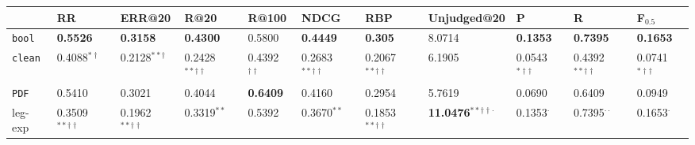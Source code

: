 \begin{tabular}{lllllllllll}
\toprule
{} &                           RR &                       ERR@20 &                         R@20 &                      R@100 &                         NDCG &                          RBP &                                 Unjudged@20 &                           P &                            R &                     F$_{0.5}$ \\
\midrule
\texttt{bool}    &              \textbf{0.5526} &              \textbf{0.3158} &                \textbf{0.4300} &                       0.5800 &              \textbf{0.4449} &               \textbf{0.305} &                                      8.0714 &             \textbf{0.1353} &              \textbf{0.7395} &             \textbf{0.1653} \\
\texttt{clean} &          0.4088$^{*\dagger}$ &         0.2128$^{**\dagger}$ &  0.2428$^{**\dagger\dagger}$ &  0.4392$^{\dagger\dagger}$ &  0.2683$^{**\dagger\dagger}$ &  0.2067$^{**\dagger\dagger}$ &                                 6.1905$^{}$ &  0.0543$^{*\dagger\dagger}$ &  0.4392$^{**\dagger\dagger}$ &  0.0741$^{*\dagger\dagger}$ \\
\texttt{PDF}     &                  0.5410$^{}$ &                  0.3021$^{}$ &                  0.4044$^{}$ &       \textbf{0.6409}$^{}$ &                  0.4160$^{}$ &                  0.2954$^{}$ &                                 5.7619$^{}$ &                 0.0690$^{}$ &                  0.6409$^{}$ &                 0.0949$^{}$ \\
leg-exp          &  0.3509$^{**\dagger\dagger}$ &  0.1962$^{**\dagger\dagger}$ &                0.3319$^{**}$ &                0.5392$^{}$ &                0.3670$^{**}$ &  0.1853$^{**\dagger\dagger}$ &  \textbf{11.0476}$^{**\dagger\dagger\cdot}$ &            0.1353$^{\cdot}$ &        0.7395$^{\cdot\cdot}$ &            0.1653$^{\cdot}$ \\
\bottomrule
\end{tabular}
